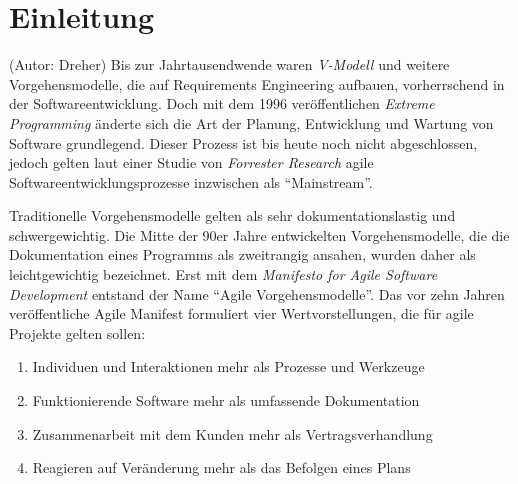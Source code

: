 \section{Einleitung}
(Autor: Dreher)
\label{sec:einfuehrung}
Bis zur Jahrtausendwende waren \emph{V-Modell} und weitere Vorgehensmodelle, die auf Requirements Engineering aufbauen, vorherrschend in der Softwareentwicklung. Doch mit dem 1996 veröffentlichen \emph{Extreme Programming} änderte sich die Art der Planung, Entwicklung und Wartung von Software grundlegend. Dieser Prozess ist bis heute noch nicht abgeschlossen, jedoch gelten laut einer Studie von \emph{Forrester Research} agile Softwareentwicklungsprozesse inzwischen als ``Mainstream''. \cite{bib:ane}

Traditionelle Vorgehensmodelle gelten als sehr dokumentationslastig und schwergewichtig. Die Mitte der 90er Jahre entwickelten Vorgehensmodelle, die die Dokumentation eines Programms als zweitrangig ansahen, wurden daher als leichtgewichtig bezeichnet. Erst mit dem \emph{Manifesto for Agile Software Development} \cite{bib:manifest} entstand der Name ``Agile Vorgehensmodelle''. \cite{bib:eckstein} Das vor zehn Jahren veröffentliche Agile Manifest formuliert vier Wertvorstellungen, die für agile Projekte gelten sollen:
\begin{enumerate}
	\item Individuen und Interaktionen mehr als Prozesse und Werkzeuge
	\item Funktionierende Software mehr als umfassende Dokumentation
	\item Zusammenarbeit mit dem Kunden mehr als Vertragsverhandlung
	\item Reagieren auf Veränderung mehr als das Befolgen eines Plans
\end{enumerate}

